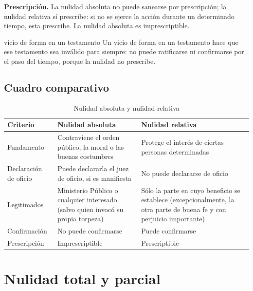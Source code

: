 \documentclass[12pt,oneside]{book}
\begin{document}
\textbf{Prescripción.} La nulidad absoluta no puede sanearse por prescripción; la nulidad relativa sí prescribe: si no se ejerce la acción durante un determinado tiempo, esta prescribe. La nulidad absoluta es imprescriptible.

\begin{example}{vicio de forma en un testamento}
Un vicio de forma en un testamento hace que ese testamento sea inválido para siempre: no puede ratificarse ni confirmarse por el paso del tiempo, porque la nulidad no prescribe.
\end{example}

\subsection*{Cuadro comparativo}

\begin{table}[H]
\centering
\caption{Nulidad absoluta y nulidad relativa}
\begin{tabularx}{\textwidth}{
    >{\raggedright\arraybackslash}p{}
    >{\raggedright\arraybackslash}X
    >{\raggedright\arraybackslash}X
}
\toprule
\textbf{Criterio} & \textbf{Nulidad absoluta} & \textbf{Nulidad relativa} \\
\midrule
Fundamento & Contraviene el orden público, la moral o las buenas costumbres & Protege el interés de ciertas personas determinadas \\
\addlinespace
Declaración de oficio & Puede declararla el juez de oficio, si es manifiesta & No puede declararse de oficio \\
\addlinespace
Legitimados & Ministerio Público o cualquier interesado (salvo quien invocó su propia torpeza) & Sólo la parte en cuyo beneficio se establece (excepcionalmente, la otra parte de buena fe y con perjuicio importante) \\
\addlinespace
Confirmación & No puede confirmarse & Puede confirmarse \\
\addlinespace
Prescripción & Imprescriptible & Prescriptible \\
\bottomrule
\end{tabularx}
\end{table}

\section{Nulidad total y parcial}
\label{sec:totalparcial}
\end{document}

